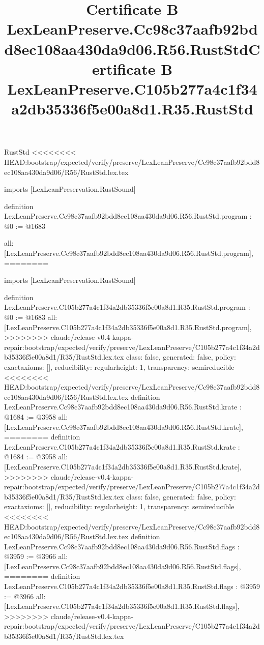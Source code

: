 \begin{lexlean}{RustStd}
<<<<<<<< HEAD:bootstrap/expected/verify/preserve/LexLeanPreserve/Cc98c37aafb92bdd8ec108aa430da9d06/R56/RustStd.lex.tex
\title{Certificate B LexLeanPreserve.Cc98c37aafb92bdd8ec108aa430da9d06.R56.RustStd}
\begin{coremodule}
imports [LexLeanPreservation.RustSound]

definition LexLeanPreserve.Cc98c37aafb92bdd8ec108aa430da9d06.R56.RustStd.program : @0 := @1683 {
  all: [LexLeanPreserve.Cc98c37aafb92bdd8ec108aa430da9d06.R56.RustStd.program],
========
\title{Certificate B LexLeanPreserve.C105b277a4c1f34a2db35336f5e00a8d1.R35.RustStd}
\begin{coremodule}
imports [LexLeanPreservation.RustSound]

definition LexLeanPreserve.C105b277a4c1f34a2db35336f5e00a8d1.R35.RustStd.program : @0 := @1683 {
  all: [LexLeanPreserve.C105b277a4c1f34a2db35336f5e00a8d1.R35.RustStd.program],
>>>>>>>> claude/release-v0.4-kappa-repair:bootstrap/expected/verify/preserve/LexLeanPreserve/C105b277a4c1f34a2db35336f5e00a8d1/R35/RustStd.lex.tex
  class: false,
  generated: false,
  policy: exact{axioms: []},
  reducibility: regular{height: 1},
  transparency: semireducible
}
<<<<<<<< HEAD:bootstrap/expected/verify/preserve/LexLeanPreserve/Cc98c37aafb92bdd8ec108aa430da9d06/R56/RustStd.lex.tex
definition LexLeanPreserve.Cc98c37aafb92bdd8ec108aa430da9d06.R56.RustStd.krate : @1684 := @3958 {
  all: [LexLeanPreserve.Cc98c37aafb92bdd8ec108aa430da9d06.R56.RustStd.krate],
========
definition LexLeanPreserve.C105b277a4c1f34a2db35336f5e00a8d1.R35.RustStd.krate : @1684 := @3958 {
  all: [LexLeanPreserve.C105b277a4c1f34a2db35336f5e00a8d1.R35.RustStd.krate],
>>>>>>>> claude/release-v0.4-kappa-repair:bootstrap/expected/verify/preserve/LexLeanPreserve/C105b277a4c1f34a2db35336f5e00a8d1/R35/RustStd.lex.tex
  class: false,
  generated: false,
  policy: exact{axioms: []},
  reducibility: regular{height: 1},
  transparency: semireducible
}
<<<<<<<< HEAD:bootstrap/expected/verify/preserve/LexLeanPreserve/Cc98c37aafb92bdd8ec108aa430da9d06/R56/RustStd.lex.tex
definition LexLeanPreserve.Cc98c37aafb92bdd8ec108aa430da9d06.R56.RustStd.flags : @3959 := @3966 {
  all: [LexLeanPreserve.Cc98c37aafb92bdd8ec108aa430da9d06.R56.RustStd.flags],
========
definition LexLeanPreserve.C105b277a4c1f34a2db35336f5e00a8d1.R35.RustStd.flags : @3959 := @3966 {
  all: [LexLeanPreserve.C105b277a4c1f34a2db35336f5e00a8d1.R35.RustStd.flags],
>>>>>>>> claude/release-v0.4-kappa-repair:bootstrap/expected/verify/preserve/LexLeanPreserve/C105b277a4c1f34a2db35336f5e00a8d1/R35/RustStd.lex.tex
}}}
\end{coremodule}}
\end{coremodule}
\end{lexlean}
